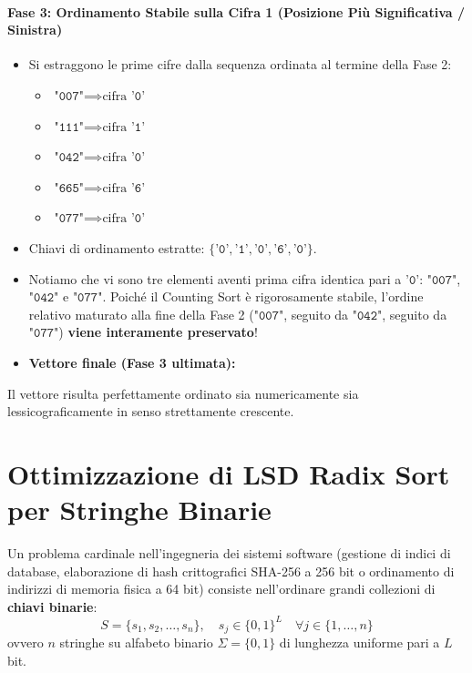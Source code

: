\paragraph{Fase 3: Ordinamento Stabile sulla Cifra 1 (Posizione Pi\`u Significativa / Sinistra)}
\begin{itemize}
  \item Si estraggono le prime cifre dalla sequenza ordinata al termine della Fase 2:
  \begin{itemize}
    \item $\texttt{"007"} \implies \text{cifra } \texttt{'0'}$
    \item $\texttt{"111"} \implies \text{cifra } \texttt{'1'}$
    \item $\texttt{"042"} \implies \text{cifra } \texttt{'0'}$
    \item $\texttt{"665"} \implies \text{cifra } \texttt{'6'}$
    \item $\texttt{"077"} \implies \text{cifra } \texttt{'0'}$
  \end{itemize}
  \item Chiavi di ordinamento estratte: $\{\texttt{'0'}, \texttt{'1'}, \texttt{'0'}, \texttt{'6'}, \texttt{'0'}\}$.
  \item Notiamo che vi sono tre elementi aventi prima cifra identica pari a $\texttt{'0'}$: $\texttt{"007"}$, $\texttt{"042"}$ e $\texttt{"077"}$. Poich\'e il Counting Sort \`e rigorosamente stabile, l'ordine relativo maturato alla fine della Fase 2 ($\texttt{"007"}$, seguito da $\texttt{"042"}$, seguito da $\texttt{"077"}$) \textbf{viene interamente preservato}!
  \item \textbf{Vettore finale (Fase 3 ultimata):}
  \begin{equation}
    [\texttt{"007"}, \; \texttt{"042"}, \; \texttt{"077"}, \; \texttt{"111"}, \; \texttt{"665"}]
  \end{equation}
\end{itemize}
Il vettore risulta perfettamente ordinato sia numericamente sia lessicograficamente in senso strettamente crescente.

\FloatBarrier
\section{Ottimizzazione di LSD Radix Sort per Stringhe Binarie}
\label{sec:ottimizzazione-stringhe-binarie}

Un problema cardinale nell'ingegneria dei sistemi software (gestione di indici di database, elaborazione di hash crittografici SHA-256 a 256 bit o ordinamento di indirizzi di memoria fisica a 64 bit) consiste nell'ordinare grandi collezioni di \textbf{chiavi binarie}:
\begin{equation}
  S = \{s_1, s_2, \dots, s_n\}, \quad s_j \in \{0, 1\}^L \quad \forall j \in \{1, \dots, n\}
\end{equation}
ovvero $n$ stringhe su alfabeto binario $\Sigma = \{0, 1\}$ di lunghezza uniforme pari a $L$ bit.

